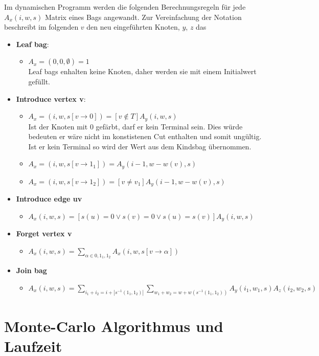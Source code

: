 Im dynamischen Programm werden die folgenden Berechnungsregeln für jede $A_x(i,w,s)$ Matrix eines Bags angewandt. Zur Vereinfachung der Notation beschreibt im folgenden $v$ den neu eingeführten Knoten, $y$, $z$ das 
\label{sec:dynP}
\begin{itemize}
\item \textbf{Leaf bag}:
\begin{itemize}
\item $A_x=(0,0,\emptyset) = 1$\\Leaf bags enhalten keine Knoten, daher werden sie mit einem Initialwert gefüllt.
\end{itemize}
\item \textbf{Introduce vertex v}:
\begin{itemize}
\item $A_x=(i,w,s[v\rightarrow 0]) = [v \notin T]A_y(i,w,s)$\\Ist der Knoten mit $0$ gefärbt, darf er kein Terminal sein. Dies würde bedeuten er wäre nicht im konstistenen Cut enthalten und somit ungültig. Ist er kein Terminal so wird der Wert aus dem Kindsbag übernommen.
\item $A_x=(i,w,s[v\rightarrow 1_1]) = A_y(i-1,w-w(v),s)$\\
\item $A_x=(i,w,s[v\rightarrow 1_2]) =[v \neq v_1] A_y(i-1,w-w(v),s)$
\end{itemize}
\item \textbf{Introduce edge uv}
\begin{itemize}
\item $A_x(i,w,s) = [s(u) = 0 \vee s(v) = 0 \vee s(u) = s(v)]A_y(i,w,s)$
\end{itemize}
\item \textbf{Forget vertex v}
\begin{itemize}
\item $A_x(i,w,s) = \sum\limits_{\alpha \in {0,1_1,1_2}} A_x(i,w,s[v \rightarrow \alpha]) $
\end{itemize}
\item \textbf{Join bag}
\begin{itemize}
\item $A_x(i,w,s) = \sum\limits_{i_1+i_2=i+|s^{-1}({1_1,1_2})|} \sum\limits_{w_1+w_2=w+w(s^{-1}({1_1,1_2}))} A_y(i_1,w_1,s)A_z(i_2,w_2,s) $
\end{itemize}
\end{itemize}


\section{Monte-Carlo Algorithmus und Laufzeit}
\label{sec:mc_alg}
